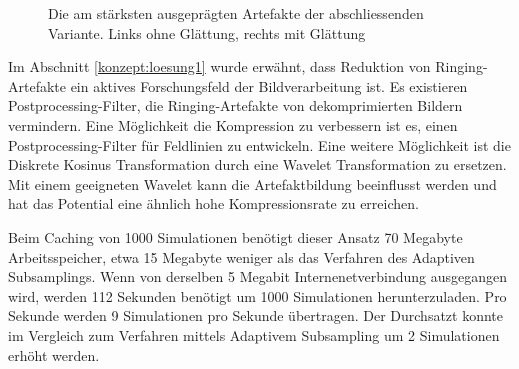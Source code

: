 \begin{figure}[!htbp]
	\center
	\caption{Die am stärksten ausgeprägten Artefakte der abschliessenden Variante. Links ohne Glättung, rechts mit Glättung}
	\label{resultate:loesung1:dct:final:artefakte}
\end{figure}
Im Abschnitt \ref{konzept:loesung1} wurde erwähnt, dass Reduktion von Ringing-Artefakte ein aktives Forschungsfeld der Bildverarbeitung ist. Es existieren Postprocessing-Filter, die Ringing-Artefakte von dekomprimierten Bildern vermindern. Eine Möglichkeit die Kompression zu verbessern ist es, einen Postprocessing-Filter für Feldlinien zu entwickeln. Eine weitere Möglichkeit ist die Diskrete Kosinus Transformation durch eine Wavelet Transformation zu ersetzen. Mit einem geeigneten Wavelet kann die Artefaktbildung beeinflusst werden und hat das Potential eine ähnlich hohe Kompressionsrate zu erreichen.

Beim Caching von 1000 Simulationen benötigt dieser Ansatz 70 Megabyte Arbeitsspeicher, etwa 15 Megabyte weniger als das Verfahren des Adaptiven Subsamplings. Wenn von derselben 5 Megabit Internenetverbindung ausgegangen wird, werden 112 Sekunden benötigt um 1000 Simulationen herunterzuladen. Pro Sekunde werden 9 Simulationen pro Sekunde übertragen. Der Durchsatzt konnte im Vergleich zum Verfahren mittels Adaptivem Subsampling um 2 Simulationen erhöht werden.

